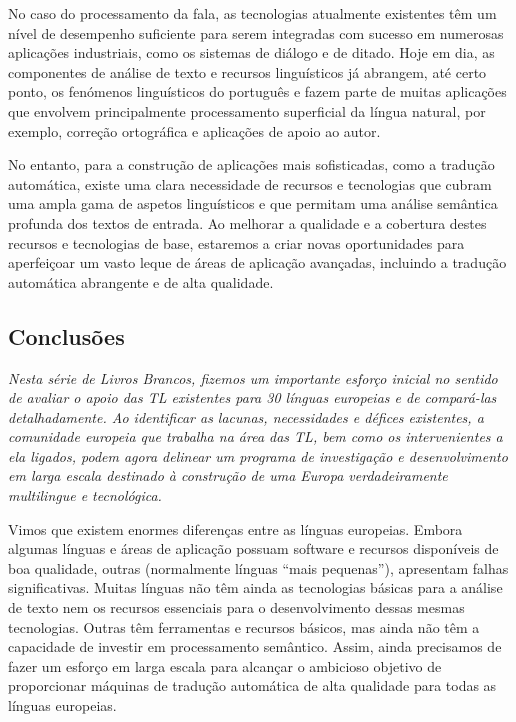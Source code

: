 \documentclass[]{../metanetpaper}
\begin{document}
\begin{multicols}{2}
No caso do processamento da fala, as tecnologias atualmente existentes têm um nível de desempenho suficiente para serem integradas com sucesso em numerosas aplicações industriais, como os sistemas de diálogo e de ditado. Hoje em dia, as componentes de análise de texto e recursos linguísticos já abrangem, até certo ponto, os fenómenos linguísticos do português e fazem parte de muitas aplicações que envolvem principalmente processamento superficial da língua natural, por exemplo, correção ortográfica e aplicações de apoio ao autor. 

No entanto, para a construção de aplicações mais sofisticadas, como a tradução automática, existe uma clara necessidade de recursos e tecnologias que cubram uma ampla gama de aspetos linguísticos e que permitam uma análise semântica profunda dos textos de entrada. Ao melhorar a qualidade e a cobertura destes recursos e tecnologias de base, estaremos a criar novas oportunidades para aperfeiçoar um vasto leque de áreas de aplicação avançadas, incluindo a tradução automática abrangente e de alta qualidade.

\subsection{Conclusões}

\emph{Nesta série de Livros Brancos, fizemos um importante esforço inicial no sentido de avaliar o apoio das TL existentes para 30 línguas europeias e de compará-las detalhadamente. Ao identificar as lacunas, necessidades e défices existentes, a comunidade europeia que trabalha na área das TL, bem como os intervenientes a ela ligados, podem agora delinear um programa de investigação e desenvolvimento em larga escala destinado à construção de uma Europa verdadeiramente multilingue e tecnológica.}

Vimos que existem enormes diferenças entre as línguas europeias. Embora algumas línguas e áreas de aplicação possuam software e recursos disponíveis de boa qualidade, outras (normalmente línguas “mais pequenas”), apresentam falhas significativas. Muitas línguas não têm ainda as tecnologias básicas para a análise de texto nem os recursos essenciais para o desenvolvimento dessas mesmas tecnologias. Outras têm ferramentas e recursos básicos, mas ainda não têm a capacidade de investir em processamento semântico. Assim, ainda precisamos de fazer um esforço em larga escala para alcançar o ambicioso objetivo de proporcionar máquinas de tradução automática de alta qualidade para todas as línguas europeias.


\end{multicols}
\end{document}
